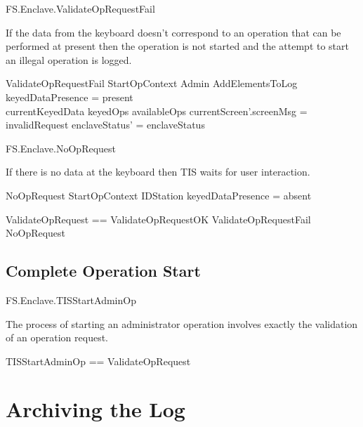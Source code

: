 \begin{traceunit}{FS.Enclave.ValidateOpRequestFail}
\end{traceunit}

If the data from the keyboard doesn't correspond to an operation that
can be performed at present then the operation is not started and the
attempt to start an illegal operation is logged.

\begin{schema}{ValidateOpRequestFail}
        StartOpContext
\also
        \Xi Admin
\also
        AddElementsToLog
\where
        keyedDataPresence = present
\\      currentKeyedData  \notin keyedOps \limg availableOps \rimg
\also
        currentScreen'.screenMsg = invalidRequest
\also
        enclaveStatus' = enclaveStatus
\end{schema}


\begin{traceunit}{FS.Enclave.NoOpRequest}
\end{traceunit}


If there is no data at the keyboard then TIS waits for user interaction.

\begin{schema}{NoOpRequest}
        StartOpContext
\also
        \Xi IDStation
\where
        keyedDataPresence = absent
\end{schema}

\begin{zed}
        ValidateOpRequest == ValidateOpRequestOK \lor
        ValidateOpRequestFail \lor NoOpRequest
\end{zed}

\subsection{Complete Operation Start}


\begin{traceunit}{FS.Enclave.TISStartAdminOp}
\end{traceunit}

The process of starting an administrator operation involves exactly the validation of an
operation request.

\begin{zed}
        TISStartAdminOp == ValidateOpRequest
\end{zed}


\section{Archiving the Log}


